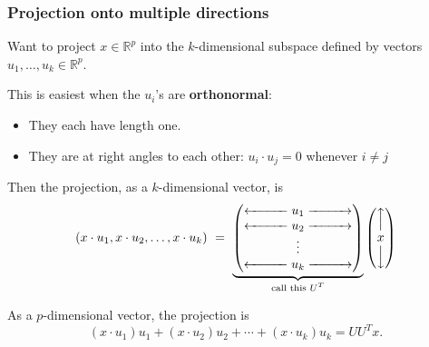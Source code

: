 \documentclass[smaller,handout]{beamer}
\def\R{{\mathbb R}}
\def\darkred{\color{red!70!black}}
\def\darkgreen{\color{green!60!black}}
\def\vone{{\vskip.1in}}
\def\R{{\mathbb R}}
\begin{document}
\begin{frame}
\frametitle{Projection onto multiple directions}

{\darkred Want to project $x \in \R^p$ into the $k$-dimensional subspace defined by vectors $u_1, \ldots, u_k \in \R^p$.}

\pause\vone
This is easiest when the $u_i$'s are {\bf orthonormal}:
\begin{itemize}
\item They each have length one.
\item They are at right angles to each other: $u_i \cdot u_j = 0$ whenever $i \neq j$
\end{itemize}

\pause\vone
Then the projection, as a $k$-dimensional vector, is
$$ (x \cdot u_1, x \cdot u_2, \ldots, x \cdot u_k)
\ = \ 
\underbrace{\begin{pmatrix} 
\xleftarrow{\hspace*{1cm}} u_1 \xrightarrow{\hspace*{1cm}} \\
\xleftarrow{\hspace*{1cm}} u_2 \xrightarrow{\hspace*{1cm}} \\
 \vdots \\ 
\xleftarrow{\hspace*{1cm}} u_k \xrightarrow{\hspace*{1cm}} 
\end{pmatrix}}_{\text{call this $U^T$}} 
\begin{pmatrix}
\Big\uparrow \\
x \\
\Big\downarrow
\end{pmatrix}
$$

\pause\vone
{\darkgreen As a $p$-dimensional vector, the projection is
$$ (x \cdot u_1) u_1 + (x \cdot u_2) u_2 + \cdots + (x \cdot u_k)u_k = UU^T x.$$}
\end{frame}
\end{document}

